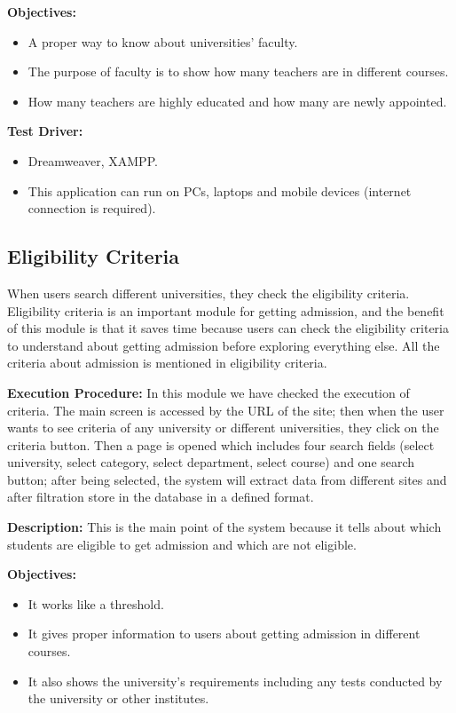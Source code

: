 \textbf{Objectives:}
\begin{itemize}
    \item A proper way to know about universities' faculty.
    \item The purpose of faculty is to show how many teachers are in different courses.
    \item How many teachers are highly educated and how many are newly appointed.
\end{itemize}

\textbf{Test Driver:}
\begin{itemize}
    \item Dreamweaver, XAMPP.
    \item This application can run on PCs, laptops and mobile devices (internet connection is required).
\end{itemize}

\subsection{Eligibility Criteria}

When users search different universities, they check the eligibility criteria. Eligibility criteria is an important module for getting admission, and the benefit of this module is that it saves time because users can check the eligibility criteria to understand about getting admission before exploring everything else. All the criteria about admission is mentioned in eligibility criteria.

\textbf{Execution Procedure:}
In this module we have checked the execution of criteria. The main screen is accessed by the URL of the site; then when the user wants to see criteria of any university or different universities, they click on the criteria button. Then a page is opened which includes four search fields (select university, select category, select department, select course) and one search button; after being selected, the system will extract data from different sites and after filtration store in the database in a defined format.

\textbf{Description:} This is the main point of the system because it tells about which students are eligible to get admission and which are not eligible.

\textbf{Objectives:}
\begin{itemize}
    \item It works like a threshold.
    \item It gives proper information to users about getting admission in different courses.
    \item It also shows the university's requirements including any tests conducted by the university or other institutes.
\end{itemize}

